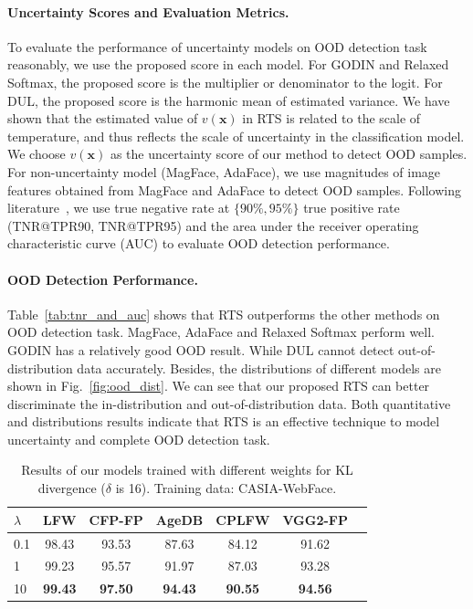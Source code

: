 \documentclass[letterpaper]{article} %
\begin{document}
\paragraph{Uncertainty Scores and Evaluation Metrics.}
To evaluate the performance of uncertainty models on OOD detection task reasonably, we use the proposed score in each model. For GODIN and Relaxed Softmax, the proposed score is the multiplier or denominator to the logit. For DUL, the proposed score is the harmonic mean of estimated variance. We have shown that the estimated value of $v(\bm{x})$ in RTS is related to the scale of temperature, and thus reflects the scale of uncertainty in the classification model. We choose $v(\bm{x})$ as the uncertainty score of our method to detect OOD samples. For non-uncertainty model (MagFace, AdaFace), we use magnitudes of image features obtained from MagFace and AdaFace to detect OOD samples. 
%
Following literature~\cite{hsu2020generalized}, we use true negative rate at $\{90\%, 95\%\}$ true positive rate (TNR@TPR90, TNR@TPR95) and the area under the receiver operating characteristic curve (AUC) to evaluate OOD detection performance.

\paragraph{OOD Detection Performance.}
Table~\ref{tab:tnr_and_auc} shows that RTS outperforms the other methods on OOD detection task. MagFace, AdaFace and Relaxed Softmax perform well. GODIN has a relatively good OOD result. While DUL cannot detect out-of-distribution data accurately. Besides, the distributions of different models are shown in Fig.~\ref{fig:ood_dist}. We can see that our proposed RTS can better discriminate the in-distribution and out-of-distribution data. Both quantitative and distributions results indicate that RTS is an effective technique to model uncertainty and complete OOD detection task.












\begin{table}
\centering
\begin{tabular}{|l|c|c|c|c|c|c|}
\hline
$\lambda$ & LFW & CFP-FP & AgeDB & CPLFW & VGG2-FP \\
\hline\hline
0.1 & 98.43 & 93.53 & 87.63 & 84.12 & 91.62 \\
1 & 99.23 & 95.57 & 91.97 & 87.03 & 93.28 \\
10 & \textbf{99.43} & \textbf{97.50} & \textbf{94.43} & \textbf{90.55} & \textbf{94.56} \\
\hline
\end{tabular}
\caption{Results of our models trained with different weights for KL divergence ($\delta$ is 16). Training data: CASIA-WebFace.}
\label{tab:kl_weight}
\end{table}
\end{document}
